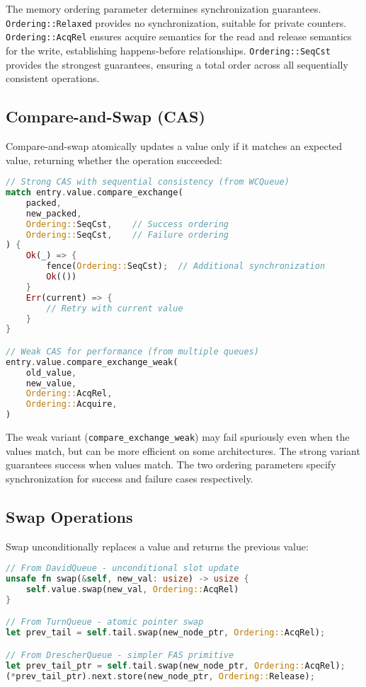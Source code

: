 The memory ordering parameter determines synchronization guarantees. \texttt{Ordering::Relaxed} provides no synchronization, suitable for private counters. \texttt{Ordering::AcqRel} ensures acquire semantics for the read and release semantics for the write, establishing happens-before relationships. \texttt{Ordering::SeqCst} provides the strongest guarantees, ensuring a total order across all sequentially consistent operations.

\subsection{Compare-and-Swap (CAS)}

Compare-and-swap atomically updates a value only if it matches an expected value, returning whether the operation succeeded:

\begin{lstlisting}[language=Rust, style=boxed, caption={Compare-and-swap variants and usage patterns}, label={lst:compare-and-swap}]
// Strong CAS with sequential consistency (from WCQueue)
match entry.value.compare_exchange(
    packed,
    new_packed,
    Ordering::SeqCst,    // Success ordering
    Ordering::SeqCst,    // Failure ordering
) {
    Ok(_) => {
        fence(Ordering::SeqCst);  // Additional synchronization
        Ok(())
    }
    Err(current) => {
        // Retry with current value
    }
}

// Weak CAS for performance (from multiple queues)
entry.value.compare_exchange_weak(
    old_value,
    new_value,
    Ordering::AcqRel,
    Ordering::Acquire,
)
\end{lstlisting}

The weak variant (\texttt{compare\_exchange\_weak}) may fail spuriously even when the values match, but can be more efficient on some architectures. The strong variant guarantees success when values match. The two ordering parameters specify synchronization for success and failure cases respectively.

\subsection{Swap Operations}

Swap unconditionally replaces a value and returns the previous value:

\begin{lstlisting}[language=Rust, style=boxed, caption={Unconditional atomic swap operations}, label={lst:swap-operations}]
// From DavidQueue - unconditional slot update
unsafe fn swap(&self, new_val: usize) -> usize {
    self.value.swap(new_val, Ordering::AcqRel)
}

// From TurnQueue - atomic pointer swap
let prev_tail = self.tail.swap(new_node_ptr, Ordering::AcqRel);

// From DrescherQueue - simpler FAS primitive
let prev_tail_ptr = self.tail.swap(new_node_ptr, Ordering::AcqRel);
(*prev_tail_ptr).next.store(new_node_ptr, Ordering::Release);
\end{lstlisting}

